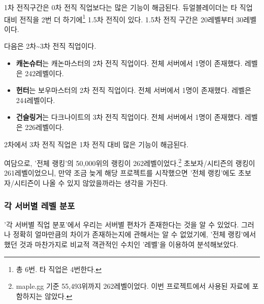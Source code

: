 \documentclass[
]{article}
\begin{document}
1차 전직구간은 0차 전직 직업보다는 많은 기능이 해금된다. 듀얼블레이더는
타 직업 대비 전직을 2번 더 하기에\footnote{총 6번. 타 직업은 4번한다.}
1.5차 전직이 있다. 1.5차 전직 구간은 20레벨부터 30레벨이다.

다음은 2차\textasciitilde3차 전직 직업이다.

\begin{itemize}
\item
  \textbf{캐논슈터}는 캐논마스터의 2차 전직 직업이다. 전체 서버에서
  1명이 존재했다. 레벨은 242레벨이다.
\item
  \textbf{헌터}는 보우마스터의 2차 전직 직업이다. 전체 서버에서 1명이
  존재했다. 레벨은 244레벨이다.
\item
  \textbf{건슬링거}는 다크나이트의 3차 전직 직업이다. 전체 서버에서
  1명이 존재했다. 레벨은 226레벨이다.
\end{itemize}

2차에서 3차 전직 직업은 1차 전직 대비 많은 기능이 해금된다.

여담으로, '전체 랭킹'의 50,000위의 랭킹이 262레벨이었다.\footnote{maple.gg
  기준 55,493위까지 262레벨이었다. 이번 프로젝트에서 사용된 자료에
  포함하지는 않았다.} 초보자/시티즌의 랭킹이 261레벨이었으니, 만약 조금
늦게 해당 프로젝트를 시작했으면 '전체 랭킹'에도 초보자/시티즌이 나올 수
있지 않았을까라는 생각을 가진다.

\hypertarget{uxac01-uxc11cuxbc84uxbcc4-uxb808uxbca8-uxbd84uxd3ec}{%
\subsubsection{각 서버별 레벨
분포}\label{uxac01-uxc11cuxbc84uxbcc4-uxb808uxbca8-uxbd84uxd3ec}}

'각 서버별 직업 분포'에서 우리는 서버별 편차가 존재한다는 것을 알 수
있었다. 그러나 정확히 얼마만큼의 차이가 존재하는지에 관해서는 알 수
없었기에, '전체 랭킹'에서 했던 것과 마찬가지로 비교적 객관적인 수치인
'레벨'을 이용하여 분석해보았다.
\end{document}
